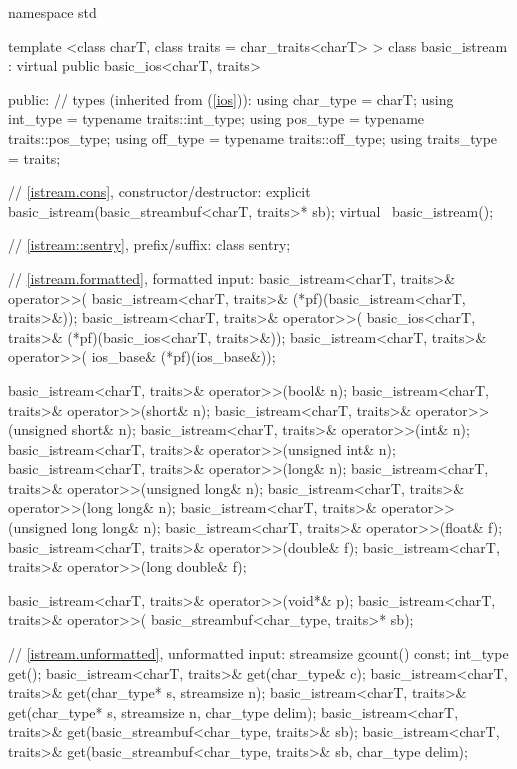 %
\begin{codeblock}
namespace std {
  template <class charT, class traits = char_traits<charT> >
  class basic_istream
    : virtual public basic_ios<charT, traits> {
  public:
    // types (inherited from  (\ref{ios})):
    using char_type   = charT;
    using int_type    = typename traits::int_type;
    using pos_type    = typename traits::pos_type;
    using off_type    = typename traits::off_type;
    using traits_type = traits;

    // \ref{istream.cons}, constructor/destructor:
    explicit basic_istream(basic_streambuf<charT, traits>* sb);
    virtual ~basic_istream();

    // \ref{istream::sentry}, prefix/suffix:
    class sentry;

    // \ref{istream.formatted}, formatted input:
    basic_istream<charT, traits>& operator>>(
      basic_istream<charT, traits>& (*pf)(basic_istream<charT, traits>&));
    basic_istream<charT, traits>& operator>>(
      basic_ios<charT, traits>& (*pf)(basic_ios<charT, traits>&));
    basic_istream<charT, traits>& operator>>(
      ios_base& (*pf)(ios_base&));

    basic_istream<charT, traits>& operator>>(bool& n);
    basic_istream<charT, traits>& operator>>(short& n);
    basic_istream<charT, traits>& operator>>(unsigned short& n);
    basic_istream<charT, traits>& operator>>(int& n);
    basic_istream<charT, traits>& operator>>(unsigned int& n);
    basic_istream<charT, traits>& operator>>(long& n);
    basic_istream<charT, traits>& operator>>(unsigned long& n);
    basic_istream<charT, traits>& operator>>(long long& n);
    basic_istream<charT, traits>& operator>>(unsigned long long& n);
    basic_istream<charT, traits>& operator>>(float& f);
    basic_istream<charT, traits>& operator>>(double& f);
    basic_istream<charT, traits>& operator>>(long double& f);

    basic_istream<charT, traits>& operator>>(void*& p);
    basic_istream<charT, traits>& operator>>(
      basic_streambuf<char_type, traits>* sb);

    // \ref{istream.unformatted}, unformatted input:
    streamsize gcount() const;
    int_type get();
    basic_istream<charT, traits>& get(char_type& c);
    basic_istream<charT, traits>& get(char_type* s, streamsize n);
    basic_istream<charT, traits>& get(char_type* s, streamsize n,
                                      char_type delim);
    basic_istream<charT, traits>& get(basic_streambuf<char_type, traits>& sb);
    basic_istream<charT, traits>& get(basic_streambuf<char_type, traits>& sb,
                                      char_type delim);

}}
\end{codeblock}
